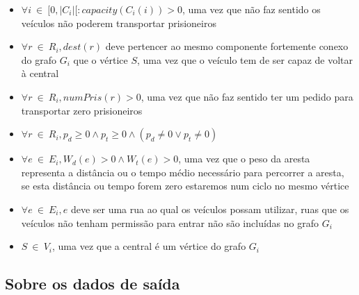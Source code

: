 \documentclass[article, a4paper, 12pt, oneside]{memoir}
\begin{document}
\begin{itemize}
	\item $\forall i ~ \in ~ [0, \vert C_i \vert [: capacity(C_i(i)) > 0$, uma vez que não faz sentido os veículos não poderem transportar prisioneiros
	\item $\forall r ~ \in ~ R_i, dest(r)$ deve pertencer ao mesmo componente fortemente conexo do grafo $G_i$ que o vértice $S$, uma vez que o veículo tem de ser capaz de voltar à central
	\item $\forall r ~ \in ~ R_i, numPris(r) > 0$, uma vez que não faz sentido ter um pedido para transportar zero prisioneiros
	\item $\forall r ~ \in ~ R_i, p_d \geq 0 \wedge p_t \geq 0 \wedge (p_d \neq 0 \vee p_t \neq 0)$
	\item $\forall e ~ \in ~ E_i, W_d(e) > 0 \wedge W_t(e) > 0$, uma vez que o peso da aresta representa a distância ou o tempo médio necessário para percorrer a aresta, se esta distância ou tempo forem zero estaremos num ciclo no mesmo vértice
	\item $\forall e ~ \in ~ E_i, e$ deve ser uma rua ao qual os veículos possam utilizar, ruas que os veículos não tenham permissão para entrar não são incluídas no grafo $G_i$
	\item $S ~ \in ~ V_i$, uma vez que a central é um vértice do grafo $G_i$
\end{itemize}

\subsection{Sobre os dados de saída}
\end{document}
